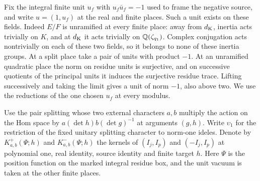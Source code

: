 \documentclass[a4paper,11pt]{article}
\theoremstyle{definition}
\theoremstyle{remark}
\numberwithin{equation}{section}
\begin{document}
Fix the integral finite unit \(u_f\) with \(u_f\bar u_f=-1\)
used to frame the negative source, and write \(u=(1,u_f)\) at
the real and finite places. Such a unit exists on these fields.
Indeed \(E/F\) is unramified at every finite place: away from
\(d_{\rm K}\), inertia acts trivially on \(K\), and at
\(d_{\rm K}\) it acts trivially on \(\mathbb Q(\zeta_{q_1})\).
Complex conjugation acts nontrivially on each of these two
fields, so it belongs to none of these inertia groups.
At a split place take a pair of units with product \(-1\).
At an unramified quadratic place the norm on residue units is
surjective, and on successive quotients of the principal units
it induces the surjective residue trace. Lifting successively
and taking the limit gives a unit of norm \(-1\), also above two.
We use the reductions of the one chosen \(u_f\) at every modulus.

Use the pair splitting whose two external characters \(a,b\)
multiply the action on the Hom space by
\(a(\det h)b(\det g)^{-1}\) at arguments \((g,h)\).
Write \(\upsilon_1\) for the restriction of the fixed
unitary splitting character to norm-one ideles. Denote by
\(K^+_{a,b}(\Psi;h)\) and \(K^-_{a,b}(\Psi;h)\) the kernels
of \((I_j,I_p)\) and \((-I_j,I_p)\) at polynomial one,
real identity, source identity and finite target \(h\).
Here \(\Psi\) is the position function on the marked integral
residue box, and the unit vacuum is taken at the other finite
places.
\end{document}

